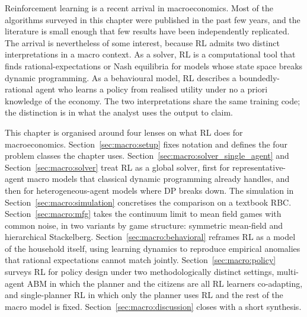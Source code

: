 
Reinforcement learning is a recent arrival in macroeconomics. Most of
the algorithms surveyed in this chapter were published in the past
few years, and the literature is small enough that few results have
been independently replicated. The arrival is nevertheless of some
interest, because RL admits two distinct interpretations in a macro
context. As
a solver, RL is a computational tool that finds rational-expectations
or Nash equilibria for models whose state space breaks dynamic
programming. As a behavioural model, RL describes a boundedly-rational
agent who learns a policy from realised utility under no a priori
knowledge of the economy. The two interpretations share the same
training code; the distinction is in what the analyst uses the output
to claim.

This chapter is organised around four lenses on what RL does for
macroeconomics. Section~\ref{sec:macro:setup} fixes notation and
defines the four problem classes the chapter uses.
Section~\ref{sec:macro:solver_single_agent} and
Section~\ref{sec:macro:solver} treat RL as a global solver, first for
representative-agent macro models that classical dynamic programming
already handles, and then for heterogeneous-agent models where DP
breaks down. The simulation in
Section~\ref{sec:macro:simulation} concretises the comparison on a
textbook RBC. Section~\ref{sec:macro:mfg} takes the continuum limit
to mean field games with common noise, in two variants by game
structure: symmetric mean-field and hierarchical Stackelberg.
Section~\ref{sec:macro:behavioral} reframes RL as a model of the
household itself, using learning dynamics to reproduce empirical
anomalies that rational expectations cannot match jointly.
Section~\ref{sec:macro:policy} surveys RL for policy design under
two methodologically distinct settings, multi-agent ABM in which
the planner and the citizens are all RL learners co-adapting, and
single-planner RL in which only the planner uses RL and the rest of
the macro model is fixed.
Section~\ref{sec:macro:discussion} closes with a short synthesis.

